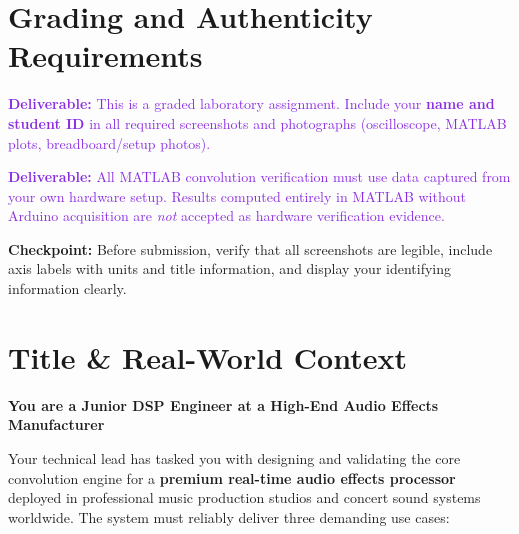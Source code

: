 \documentclass[11pt,letterpaper]{article}
\providecommand{\cpECE}[1]{\textcolor{OliveGreen}{\textbf{Checkpoint:} #1}}
\providecommand{\delECE}[1]{\textcolor{BlueViolet}{\textbf{Deliverable:} #1}}
\begin{document}
\clearpage

\section*{Grading and Authenticity Requirements}

\delECE{This is a graded laboratory assignment. Include your \textbf{name and student ID} in all required screenshots and photographs (oscilloscope, MATLAB plots, breadboard/setup photos).}

\delECE{All MATLAB convolution verification must use data captured from your own hardware setup. Results computed entirely in MATLAB without Arduino acquisition are \emph{not} accepted as hardware verification evidence.}

\cpECE{Before submission, verify that all screenshots are legible, include axis labels with units and title information, and display your identifying information clearly.}

\clearpage

\section*{Title \& Real-World Context}

\noindent
\textbf{\large You are a Junior DSP Engineer at a High-End Audio Effects Manufacturer}

\noindent
Your technical lead has tasked you with designing and validating the core convolution engine for a \textbf{premium real-time audio effects processor} deployed in professional music production studios and concert sound systems worldwide. The system must reliably deliver three demanding use cases:
\end{document}
